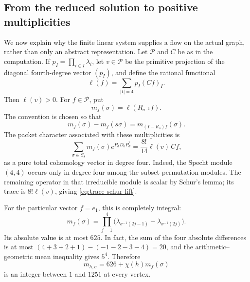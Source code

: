\subsection{From the reduced solution to positive multiplicities}

We now explain why the finite linear system supplies a flow on the
actual graph, rather than only an abstract representation.
Let \(\mathcal P\) and \(C\) be as in the computation.  If
\(p_I=\prod_{i\in I}\lambda_i\), let \(v\in\mathcal P\)
be the primitive projection of the diagonal fourth-degree vector
\((p_I)\), and define the rational functional
\[
 \ell(f)=\sum_{|I|=4}p_I(Cf)_I.
\]
Then \(\ell(v)>0\).  For \(f\in\mathcal P\), put
\begin{equation}
 m_f(\sigma)=\ell(R_{\sigma^{-1}}f).
 \label{eq:trace-matrix-coefficient}
\end{equation}
The convention is chosen so that
\[
 m_f(\sigma)-m_f(s\sigma)=m_{(I-R_s)f}(\sigma).
\]
The packet character associated with these multiplicities is
\begin{equation}
 \sum_{\sigma\in S_8}m_f(\sigma)e^{P_\sigma D_0P_\sigma^*}
 =\frac{8!}{14}\ell(v)\,Cf,
 \label{eq:trace-schur-lift}
\end{equation}
as a pure total cohomology vector in degree four.
Indeed, the Specht module \((4,4)\) occurs only in degree four
among the subset permutation modules.  The remaining operator in
that irreducible module is scalar by Schur's lemma; its trace is
\(8!\ell(v)\), giving \eqref{eq:trace-schur-lift}.

For the particular vector \(f=e_1\), this is completely integral:
\begin{equation}
 m_f(\sigma)=\prod_{j=1}^4
  \bigl(\lambda_{\sigma^{-1}(2j-1)}
       -\lambda_{\sigma^{-1}(2j)}\bigr).
 \label{eq:trace-explicit-multiplicity}
\end{equation}
Its absolute value is at most \(625\).  In fact, the sum of the
four absolute differences is at most
\((4+3+2+1)-(-1-2-3-4)=20\), and the arithmetic--geometric
mean inequality gives \(5^4\).  Therefore
\begin{equation}
 m_{h,\sigma}=626+\chi(h)m_f(\sigma)
 \label{eq:trace-positive-multiplicity}
\end{equation}
is an integer between \(1\) and \(1251\) at every vertex.

